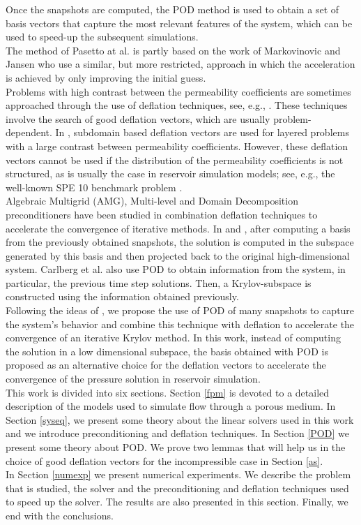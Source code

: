 \documentclass[12pt]{article}
\begin{document}
Once the snapshots are computed, the POD method is used to obtain a set of basis vectors that capture the most relevant features of the system, which can be used to speed-up the subsequent simulations.\\
The method of Pasetto at al. \cite{Pasetto16} is partly based on the work of Markovinovic and Jansen \cite{Mark06} who use a similar, but more restricted, approach in which the acceleration is 
achieved by only improving the initial guess.\\
Problems with high contrast between the permeability coefficients are sometimes approached through the use of deflation techniques, see, e.g., \cite{Vuik99}. These techniques involve the search of good deflation vectors, which are usually problem-dependent. In \cite{Vuik99}, subdomain based deflation vectors are used for layered problems with a large contrast between permeability coefficients. However, 
these deflation vectors cannot be used if the distribution of the permeability coefficients is not structured, as is usually the case in reservoir simulation models; see, e.g., the well-known SPE 10 benchmark problem \cite{Christie01}.\\
Algebraic Multigrid (AMG)\cite{Klie07}, Multi-level and Domain Decomposition \cite{Tang09} preconditioners have been studied in combination deflation techniques to accelerate the convergence of iterative methods.
In \cite{Mark06,Astrid11} and \cite{Pasetto16}, after computing a basis from the previously obtained snapshots, the solution is computed in the subspace generated by this basis and then projected back to the original high-dimensional system. Carlberg et al. \cite{Carlberg15} also use POD to obtain information from the system, in particular, the previous time step solutions. Then, a Krylov-subspace is constructed using the information obtained previously.\\
Following the ideas of \cite{Astrid11,Mark06,Pasetto16,Carlberg15}, we propose the use of POD of many snapshots to capture the system's behavior and combine this technique with deflation to accelerate the convergence of an iterative Krylov method.
In this work, instead of computing the solution in a low dimensional subspace, the basis obtained with POD is proposed as an alternative choice for the deflation vectors to accelerate the convergence of the pressure solution in reservoir simulation.  \\
This work is divided into six sections. 
  Section \ref{fpm} is devoted to a detailed description of the models used to simulate flow through a porous medium. In Section \ref{syseq}, we present some theory about the linear solvers used in this work and we introduce preconditioning 
  and deflation techniques. 
  In Section \ref{POD} we present some theory about POD. We prove two lemmas that will help us in the choice of good deflation vectors for the 
  incompressible case in Section \ref{as}.\\
 In Section \ref{numexp} we present numerical experiments. We describe the problem that is studied, the solver and the preconditioning and deflation techniques used to speed up the solver. The results are also presented in this section.
 Finally, we end with the conclusions.
 \newpage
\end{document}
